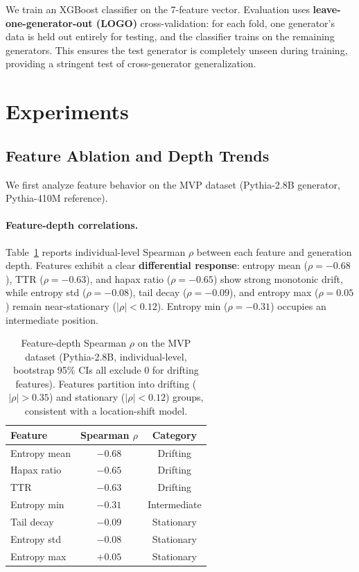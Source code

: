 \documentclass[11pt,a4paper]{article}
\begin{document}
We train an XGBoost classifier on the 7-feature vector. Evaluation uses \textbf{leave-one-generator-out (LOGO)} cross-validation: for each fold, one generator's data is held out entirely for testing, and the classifier trains on the remaining generators. This ensures the test generator is completely unseen during training, providing a stringent test of cross-generator generalization.

\section{Experiments}

\subsection{Feature Ablation and Depth Trends}
\label{sec:ablation}

We first analyze feature behavior on the MVP dataset (Pythia-2.8B generator, Pythia-410M reference).

\paragraph{Feature-depth correlations.}
Table~\ref{tab:spearman} reports individual-level Spearman $\rho$ between each feature and generation depth. Features exhibit a clear \textbf{differential response}: entropy mean ($\rho = -0.68$), TTR ($\rho = -0.63$), and hapax ratio ($\rho = -0.65$) show strong monotonic drift, while entropy std ($\rho = -0.08$), tail decay ($\rho = -0.09$), and entropy max ($\rho = 0.05$) remain near-stationary ($|\rho| < 0.12$). Entropy min ($\rho = -0.31$) occupies an intermediate position.

\begin{table}[t]
\centering
\small
\begin{tabular}{lcc}
\toprule
\textbf{Feature} & \textbf{Spearman $\rho$} & \textbf{Category} \\
\midrule
Entropy mean     & $-0.68$ & Drifting \\
Hapax ratio      & $-0.65$ & Drifting \\
TTR              & $-0.63$ & Drifting \\
Entropy min      & $-0.31$ & Intermediate \\
Tail decay       & $-0.09$ & Stationary \\
Entropy std      & $-0.08$ & Stationary \\
Entropy max      & $+0.05$ & Stationary \\
\bottomrule
\end{tabular}
\caption{Feature-depth Spearman $\rho$ on the MVP dataset (Pythia-2.8B, individual-level, bootstrap 95\% CIs all exclude 0 for drifting features). Features partition into drifting ($|\rho| > 0.35$) and stationary ($|\rho| < 0.12$) groups, consistent with a location-shift model.}
\label{tab:spearman}
\end{table}
\end{document}
